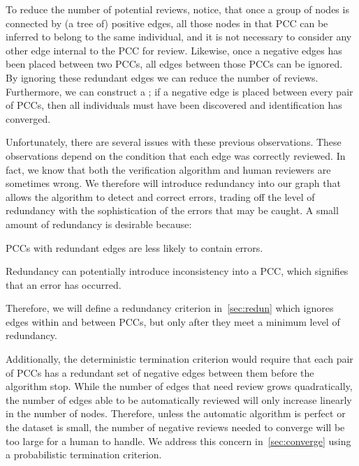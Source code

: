 To reduce the number of potential reviews, notice, that once a group of nodes is connected by (a tree of)
  positive edges, all those nodes in that PCC can be inferred to belong to the same individual, and it is not
  necessary to consider any other edge internal to the PCC for review.
Likewise, once a negative edges has been placed between two PCCs, all edges between those PCCs can be ignored.
By ignoring these redundant edges we can reduce the number of reviews.
Furthermore, we can construct a ; if a negative edge is placed
  between every pair of PCCs, then all individuals must have been discovered and identification has converged.

Unfortunately, there are several issues with these previous observations.
These observations depend on the condition that each edge was correctly reviewed.
In fact, we know that both the verification algorithm and human reviewers are sometimes wrong.
We therefore will introduce redundancy into our graph that allows the algorithm to detect and correct errors,
  trading off the level of redundancy with the sophistication of the errors that may be caught.
A small amount of redundancy is desirable because:
\begin{itemln}
    \item PCCs with redundant edges are less likely to contain errors.
    \item Redundancy can potentially introduce inconsistency into a PCC, which signifies that an error has
      occurred.
\end{itemln}
Therefore, we will define a redundancy criterion in~\cref{sec:redun} which ignores edges within and between PCCs,
  but only after they meet a minimum level of redundancy.

Additionally, the deterministic termination criterion would require that each pair of PCCs has a redundant set of
  negative edges between them before the algorithm stop.
While the number of edges that need review grows quadratically, the number of edges able to be automatically
  reviewed will only increase linearly in the number of nodes.
Therefore, unless the automatic algorithm is perfect or the dataset is small, the number of negative reviews
  needed to converge will be too large for a human to handle.
We address this concern in~\cref{sec:converge} using a probabilistic termination criterion.



